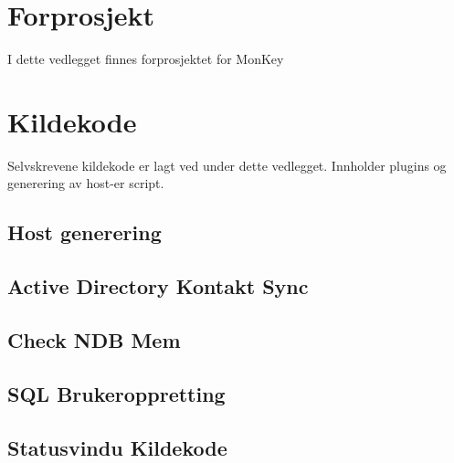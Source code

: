 \documentclass[a4paper,twoside,11pt,pdftex,norsk]{report}
\newcounter{includepdfpage}
\newcounter{currentpagecounter}
\newcommand{\addlabelstoallincludedpages}[1]{
   \refstepcounter{includepdfpage}
   \stepcounter{currentpagecounter}
	\appendix
   \label{#1.\thecurrentpagecounter}}
\newcommand{\modifiedincludepdf}[3]{
    \setcounter{currentpagecounter}{0}
    }
\newenvironment{changemargin}[2]{%
\begin{list}{}{%
\linespread{0.9}%
\setlength{\topsep}{0pt}%
\setlength{\leftmargin}{#1}%
\setlength{\rightmargin}{#2}%
\setlength{\listparindent}{\parindent}%
\setlength{\itemindent}{\parindent}%
\setlength{\parsep}{\parskip}%
}%
\item[]}{\end{list}}
\begin{document}
\begin{appendices}
\chapter{Forprosjekt}\label{app:forprosjekt}
I dette vedlegget finnes forprosjektet for MonKey


\chapter{Kildekode}\label{app:kildekode}
Selvskrevene kildekode er lagt ved under dette vedlegget. Innholder plugins og generering av host-er script.

\begin{changemargin}{-1cm}{-1cm}
\section{Host generering}


\section{Active Directory Kontakt Sync}


\section{Check NDB Mem}

\clearpage
\section{SQL Brukeroppretting}



\section{Statusvindu Kildekode}







\clearpage

\end{changemargin}
\end{appendices}
\end{document}
